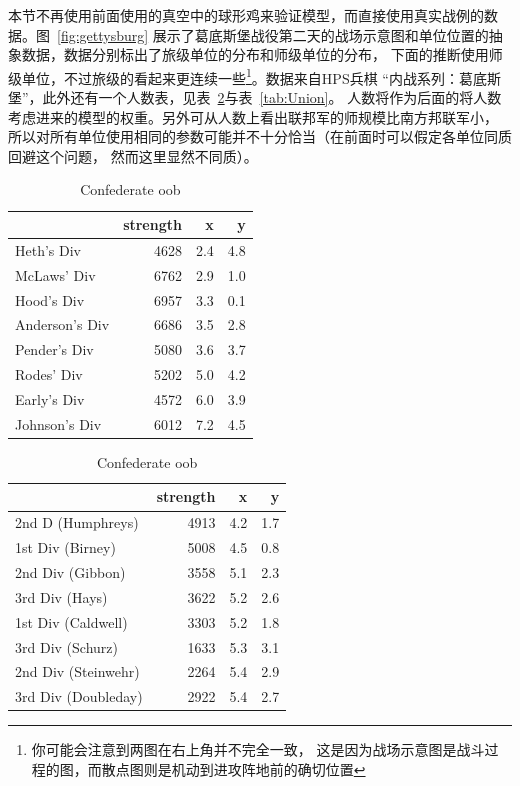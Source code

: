\documentclass{article}
\begin{document}
本节不再使用前面使用的真空中的球形鸡来验证模型，而直接使用真实战例的数据。图~\ref{fig:gettysburg}
展示了葛底斯堡战役第二天的战场示意图和单位位置的抽象数据，数据分别标出了旅级单位的分布和师级单位的分布，
下面的推断使用师级单位，不过旅级的看起来更连续一些\footnote{你可能会注意到两图在右上角并不完全一致，
这是因为战场示意图是战斗过程的图，而散点图则是机动到进攻阵地前的确切位置}。数据来自HPS兵棋
“内战系列：葛底斯堡”，此外还有一个人数表，见表~\ref{tab:Confederate}与表~\ref{tab:Union}。
人数将作为后面的将人数考虑进来的模型的权重。另外可从人数上看出联邦军的师规模比南方邦联军小，
所以对所有单位使用相同的参数可能并不十分恰当（在前面时可以假定各单位同质回避这个问题，
然而这里显然不同质）。

\begin{table}
\parbox{.45\linewidth}{
\begin{tabular}{lrrr}
\toprule
{} &  strength &    x &    y \\
\midrule
Heth's Div     &      4628 &  2.4 &  4.8 \\
McLaws' Div    &      6762 &  2.9 &  1.0 \\
Hood's Div     &      6957 &  3.3 &  0.1 \\
Anderson's Div &      6686 &  3.5 &  2.8 \\
Pender's Div   &      5080 &  3.6 &  3.7 \\
Rodes' Div     &      5202 &  5.0 &  4.2 \\
Early's Div    &      4572 &  6.0 &  3.9 \\
Johnson's Div  &      6012 &  7.2 &  4.5 \\
\bottomrule
\end{tabular}
\caption{Confederate oob}
\label{tab:Confederate}
}
\hfill
\parbox{.45\linewidth}{
\begin{tabular}{lrrr}
\toprule
{} &  strength &    x &    y \\
\midrule
2nd D (Humphreys)   &      4913 &  4.2 &  1.7 \\
1st Div (Birney)    &      5008 &  4.5 &  0.8 \\
2nd Div (Gibbon)    &      3558 &  5.1 &  2.3 \\
3rd Div (Hays)      &      3622 &  5.2 &  2.6 \\
1st Div (Caldwell)  &      3303 &  5.2 &  1.8 \\
3rd Div (Schurz)    &      1633 &  5.3 &  3.1 \\
2nd Div (Steinwehr) &      2264 &  5.4 &  2.9 \\
3rd Div (Doubleday) &      2922 &  5.4 &  2.7 \\

\end{tabular}}
\end{table}
\end{document}
